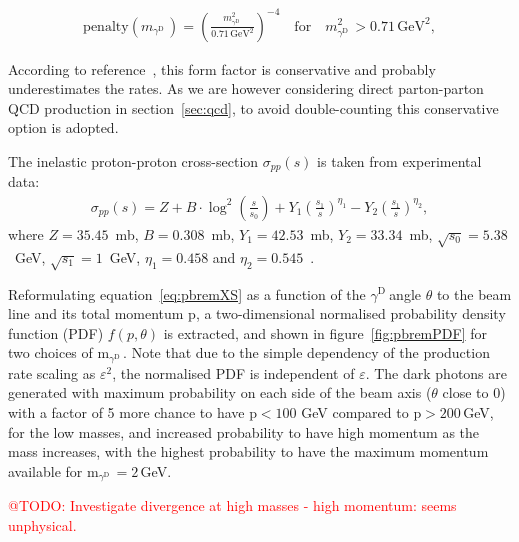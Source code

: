 \documentclass[12pt,a4paper]{article}
\newcommand{\mathDP}{\gamma^{\mathrm{D}}\ }
\newcommand{\DP}{$\mathDP$}
\newcommand{\mDP}{m$_{\mathDP}$}
\begin{document}
\begin{align}
	\mathrm{penalty}(m_{\mathDP}) = {\left(\frac{m_{\mathDP}^2}{0.71\,\mathrm{GeV}^2}\right)}^{-4}\quad \mathrm{ for }\quad m_{\mathDP}^2 > 0.71\,\mathrm{GeV}^2,
\end{align}

According to reference~\cite{Gorbunov:2014wqa}, this form factor is
conservative and probably underestimates the rates. As we are however
considering direct parton-parton QCD production in
section~\ref{sec:qcd}, to avoid double-counting this conservative
option is adopted.

The inelastic proton-proton cross-section $\sigma_{pp}(s)$ is taken
from experimental data:
\begin{align}
\sigma_{pp}(s) = Z + B\cdot \log^2\left(\frac{s}{s_0}\right) + Y_1\left(\frac{s_1}{s}\right)^{\eta_1} - 
Y_2\left(\frac{s_1}{s}\right)^{\eta_2},
\end{align}
where $Z = 35.45$~mb, $B = 0.308$~mb, $Y_1 = 42.53$~mb, $Y_2 = 33.34$~mb, $\sqrt{s_0} = 5.38$~GeV, 
$\sqrt{s_1} = 1$~GeV, $\eta_1 = 0.458$ and $\eta_2 = 0.545$~\cite{Agashe:2014kda}.

Reformulating equation~\ref{eq:pbremXS} as a function of the \DP angle
$\theta$ to the beam line and its total momentum p, a two-dimensional
normalised probability density function (PDF) $f(p, \theta)$ is
extracted, and shown in figure~\ref{fig:pbremPDF} for two choices of
\mDP. Note that due to the simple dependency of the production rate
scaling as $\varepsilon^2$, the normalised PDF is independent of
$\varepsilon$. The dark photons are generated with maximum probability
on each side of the beam axis ($\theta$ close to 0) with a factor of 5
more chance to have p$<100$ GeV compared to p$>200$\,GeV, for the low
masses, and increased probability to have high momentum as the mass
increases, with the highest probability to have the maximum momentum
available for \mDP$=2$\,GeV.

\textcolor{red}{@TODO: Investigate divergence at high masses - high momentum: seems unphysical.}
\end{document}
